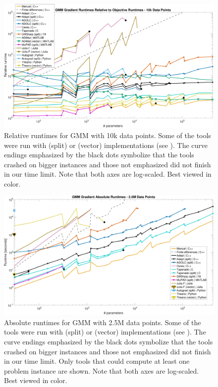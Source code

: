 \documentclass[suppldata]{article}
\begin{document}
\begin{figure}[ht]
    \includegraphics[width=\textwidth]{figs/gmm-rel-10k-legend}
    \caption{Relative runtimes for GMM with 10k data points. Some of the tools were run with (split) or (vector) implementations (see ). 
  The curve endings emphasized by the black dots symbolize that the tools crashed on bigger instances and those not emphasized did not finish in our time limit. 
  Note that both axes are log-scaled. Best viewed in color.}
    \label{fig:gmm-10k-rel}
\end{figure}

\begin{figure}[ht]
    \includegraphics[width=\textwidth]{figs/gmm-abs-2_5M-legend}
    \caption{Absolute runtimes for GMM with 2.5M data points. Some of the tools were run with (split) or (vector) implementations (see ). 
  The curve endings emphasized by the black dots symbolize that the tools crashed on bigger instances and those not emphasized did not finish in our time limit. 
  Only tools that could compute at least one problem instance are shown.
  Note that both axes are log-scaled. Best viewed in color.}
    \label{fig:gmm-2.5M}
\end{figure}
\end{document}
